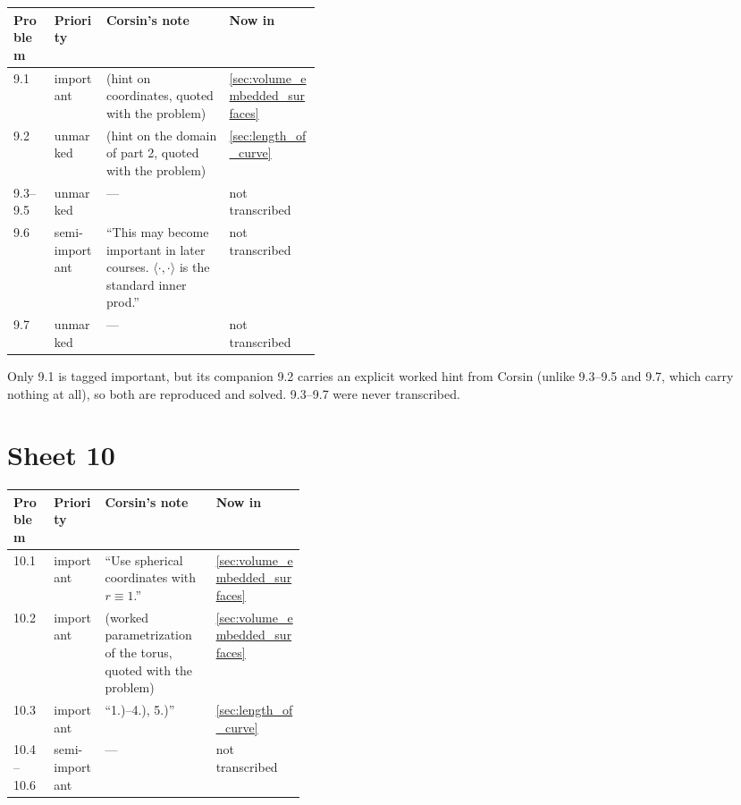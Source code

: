 \begin{center}
\begin{tabular}{@{}l l p{0.40\linewidth} l@{}}
\textbf{Problem} & \textbf{Priority} & \textbf{Corsin's note} & \textbf{Now in} \\
\hline
9.1 & important & (hint on coordinates, quoted with the problem) &
  \cref{sec:volume_embedded_surfaces} \\[3pt]
9.2 & unmarked & (hint on the domain of part 2, quoted with the problem) &
  \cref{sec:length_of_curve} \\[3pt]
9.3--9.5 & unmarked & --- & not transcribed \\[3pt]
9.6 & semi-important & ``This may become important in later courses.
  $\langle\cdot,\cdot\rangle$ is the standard inner prod.'' & not transcribed \\[3pt]
9.7 & unmarked & --- & not transcribed \\
\end{tabular}
\end{center}

\begin{ainote}
Only 9.1 is tagged important, but its companion 9.2 carries an explicit worked hint from Corsin
(unlike 9.3--9.5 and 9.7, which carry nothing at all), so both are reproduced and solved.
9.3--9.7 were never transcribed.
\end{ainote}

\section{Sheet 10}
\label{sec:sheet_index_10}

\begin{center}
\begin{tabular}{@{}l l p{0.38\linewidth} l@{}}
\textbf{Problem} & \textbf{Priority} & \textbf{Corsin's note} & \textbf{Now in} \\
\hline
10.1 & important & ``Use spherical coordinates with $r\equiv1$.'' &
  \cref{sec:volume_embedded_surfaces} \\[3pt]
10.2 & important & (worked parametrization of the torus, quoted with the problem) &
  \cref{sec:volume_embedded_surfaces} \\[3pt]
10.3 & important & ``1.)--4.), 5.)'' & \cref{sec:length_of_curve} \\[3pt]
10.4--10.6 & semi-important & --- & not transcribed \\
\end{tabular}
\end{center}

